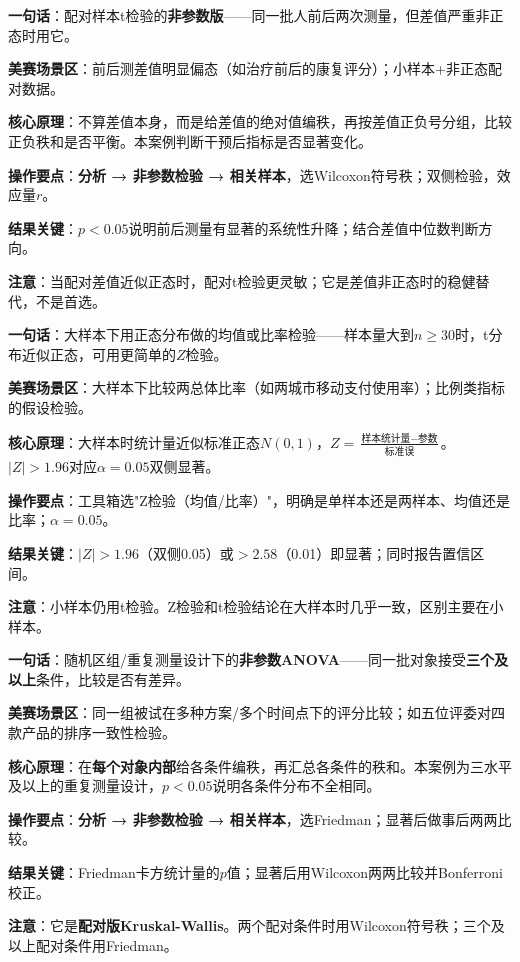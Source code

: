 
\begin{algobrief}
\textbf{一句话}：配对样本t检验的\textbf{非参数版}——同一批人前后两次测量，但差值严重非正态时用它。

\textbf{美赛场景区}：前后测差值明显偏态（如治疗前后的康复评分）；小样本+非正态配对数据。

\textbf{核心原理}：不算差值本身，而是给差值的绝对值编秩，再按差值正负号分组，比较正负秩和是否平衡。本案例判断干预后指标是否显著变化。

\textbf{操作要点}：\textbf{分析 → 非参数检验 → 相关样本}，选Wilcoxon符号秩；双侧检验，效应量$r$。

\textbf{结果关键}：$p<0.05$说明前后测量有显著的系统性升降；结合差值中位数判断方向。

\textbf{注意}：当配对差值近似正态时，配对t检验更灵敏；它是差值非正态时的稳健替代，不是首选。
\end{algobrief}


\begin{algobrief}
\textbf{一句话}：大样本下用正态分布做的均值或比率检验——样本量大到$n\geq30$时，t分布近似正态，可用更简单的$Z$检验。

\textbf{美赛场景区}：大样本下比较两总体比率（如两城市移动支付使用率）；比例类指标的假设检验。

\textbf{核心原理}：大样本时统计量近似标准正态$N(0,1)$，$Z=\frac{\text{样本统计量}-\text{参数}}{\text{标准误}}$。$|Z|>1.96$对应$\alpha=0.05$双侧显著。

\textbf{操作要点}：工具箱选"Z检验（均值/比率）"，明确是单样本还是两样本、均值还是比率；$\alpha=0.05$。

\textbf{结果关键}：$|Z|>1.96$（双侧0.05）或$>2.58$（0.01）即显著；同时报告置信区间。

\textbf{注意}：小样本仍用t检验。Z检验和t检验结论在大样本时几乎一致，区别主要在小样本。
\end{algobrief}


\begin{algobrief}
\textbf{一句话}：随机区组/重复测量设计下的\textbf{非参数ANOVA}——同一批对象接受\textbf{三个及以上}条件，比较是否有差异。

\textbf{美赛场景区}：同一组被试在多种方案/多个时间点下的评分比较；如五位评委对四款产品的排序一致性检验。

\textbf{核心原理}：在\textbf{每个对象内部}给各条件编秩，再汇总各条件的秩和。本案例为三水平及以上的重复测量设计，$p<0.05$说明各条件分布不全相同。

\textbf{操作要点}：\textbf{分析 → 非参数检验 → 相关样本}，选Friedman；显著后做事后两两比较。

\textbf{结果关键}：Friedman卡方统计量的$p$值；显著后用Wilcoxon两两比较并Bonferroni校正。

\textbf{注意}：它是\textbf{配对版Kruskal-Wallis}。两个配对条件时用Wilcoxon符号秩；三个及以上配对条件用Friedman。
\end{algobrief}

